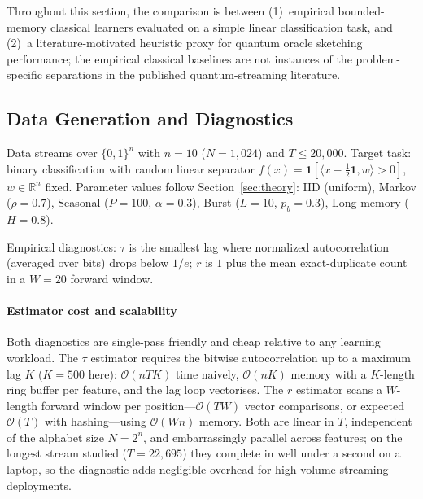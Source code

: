 \documentclass[sensors,article,submit,pdftex,moreauthors]{Definitions/mdpi}
\newcommand{\R}{\mathbb{R}}
\newcommand{\bigO}{\mathcal{O}}
\providecommand{\DIFadd}[1]{{\protect\color{blue}#1}} %
\providecommand{\DIFdel}[1]{} %
\providecommand{\DIFaddbegin}{} %
\providecommand{\DIFaddend}{} %
\providecommand{\DIFdelbegin}{} %
\providecommand{\DIFdelend}{} %
\begin{document}
Throughout this section, the comparison is between (1)~empirical bounded-memory classical learners evaluated on a simple linear classification task, and (2)~a \DIFdelbegin \DIFdel{theory-inspired }\DIFdelend \DIFaddbegin \DIFadd{literature-motivated }\DIFaddend heuristic proxy for quantum oracle sketching performance; the empirical classical baselines are not \DIFdelbegin \DIFdel{the hard problem }\DIFdelend instances of the \DIFdelbegin \DIFdel{exact framework's lower-bound constructions}\DIFdelend \DIFaddbegin \DIFadd{problem-specific separations in the published quantum-streaming literature}\DIFaddend .

\subsection{Data Generation and Diagnostics}

Data streams over $\{0,1\}^n$ with $n = 10$ ($N = 1{,}024$) and $T \leq 20{,}000$. Target task: binary classification with random linear separator $f(x) = \mathbf{1}[\langle x - \tfrac{1}{2}\mathbf{1}, w \rangle > 0]$, $w \in \R^n$ fixed. Parameter values follow Section~\ref{sec:theory}: IID (uniform), Markov ($\rho = 0.7$), Seasonal ($P = 100$, $\alpha = 0.3$), Burst ($L = 10$, $p_b = 0.3$), Long-memory ($H = 0.8$).

Empirical diagnostics: $\tau$ is the smallest lag where normalized autocorrelation (averaged over bits) drops below $1/e$; $r$ is $1$ plus the mean exact-duplicate count in a $W = 20$ forward window.

\DIFaddbegin \paragraph{\DIFadd{Estimator cost and scalability}} \DIFadd{Both diagnostics are single-pass friendly and cheap relative to any learning workload. The $\tau$ estimator requires the bitwise autocorrelation up to a maximum lag $K$ ($K = 500$ here): $\bigO(n T K)$ time naively, $\bigO(n K)$ memory with a $K$-length ring buffer per feature, and the lag loop vectorises. The $r$ estimator scans a $W$-length forward window per position---$\bigO(T W)$ vector comparisons, or expected $\bigO(T)$ with hashing---using $\bigO(W n)$ memory. Both are linear in $T$, independent of the alphabet size $N = 2^n$, and embarrassingly parallel across features; on the longest stream studied ($T = 22{,}695$) they complete in well under a second on a laptop, so the diagnostic adds negligible overhead for high-volume streaming deployments.
}
\end{document}
